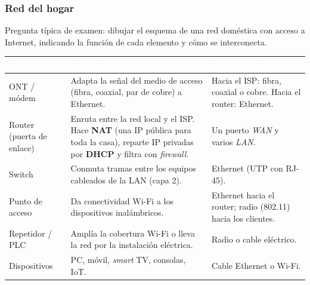 \documentclass[11pt,a4paper]{article}
\newcommand{\hd}[1]{\cellcolor{uahblue}\textcolor{white}{\textbf{#1}}}
\begin{document}
\subsubsection{Red del hogar}

Pregunta típica de examen: dibujar el esquema de una red doméstica con acceso a Internet, indicando la función de cada elemento y cómo se interconecta.

\begin{center}
\end{center}

\begin{tabularx}{\textwidth}{@{}L{3.2cm}XL{3.6cm}@{}}
\toprule
\hd{Elemento} & \hd{Función} & \hd{Interconexión} \\
\midrule
ONT / módem & Adapta la señal del medio de acceso (fibra, coaxial, par de cobre) a Ethernet. & Hacia el ISP: fibra, coaxial o cobre. Hacia el router: Ethernet. \\
Router (puerta de enlace) & Enruta entre la red local y el ISP. Hace \textbf{NAT} (una IP pública para toda la casa), reparte IP privadas por \textbf{DHCP} y filtra con \emph{firewall}. & Un puerto \emph{WAN} y varios \emph{LAN}. \\
Switch & Conmuta tramas entre los equipos cableados de la LAN (capa 2). & Ethernet (UTP con RJ-45). \\
Punto de acceso & Da conectividad Wi-Fi a los dispositivos inalámbricos. & Ethernet hacia el router; radio (802.11) hacia los clientes. \\
Repetidor / PLC & Amplía la cobertura Wi-Fi o lleva la red por la instalación eléctrica. & Radio o cable eléctrico. \\
Dispositivos & PC, móvil, \emph{smart} TV, consolas, IoT. & Cable Ethernet o Wi-Fi. \\
\bottomrule
\end{tabularx}
\end{document}
